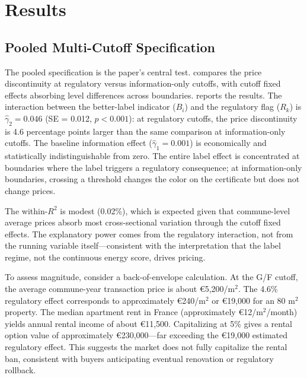 \documentclass[12pt]{article}
\begin{document}
\section{Results}

\subsection{Pooled Multi-Cutoff Specification}

The pooled specification is the paper's central test.  compares the price discontinuity at regulatory versus information-only cutoffs, with cutoff fixed effects absorbing level differences across boundaries.  reports the results. The interaction between the better-label indicator ($B_i$) and the regulatory flag ($R_k$) is $\hat{\gamma}_2 = 0.046$ (SE = 0.012, $p < 0.001$): at regulatory cutoffs, the price discontinuity is 4.6 percentage points larger than the same comparison at information-only cutoffs. The baseline information effect ($\hat{\gamma}_1 = 0.001$) is economically and statistically indistinguishable from zero. The entire label effect is concentrated at boundaries where the label triggers a regulatory consequence; at information-only boundaries, crossing a threshold changes the color on the certificate but does not change prices.



The within-$R^2$ is modest (0.02\%), which is expected given that commune-level average prices absorb most cross-sectional variation through the cutoff fixed effects. The explanatory power comes from the regulatory interaction, not from the running variable itself---consistent with the interpretation that the label regime, not the continuous energy score, drives pricing.

To assess magnitude, consider a back-of-envelope calculation. At the G/F cutoff, the average commune-year transaction price is about \euro 5,200/m$^2$. The 4.6\% regulatory effect corresponds to approximately \euro 240/m$^2$ or \euro 19,000 for an 80 m$^2$ property. The median apartment rent in France (approximately \euro 12/m$^2$/month) yields annual rental income of about \euro 11,500. Capitalizing at 5\% gives a rental option value of approximately \euro 230,000---far exceeding the \euro 19,000 estimated regulatory effect. This suggests the market does not fully capitalize the rental ban, consistent with buyers anticipating eventual renovation or regulatory rollback.
\end{document}
